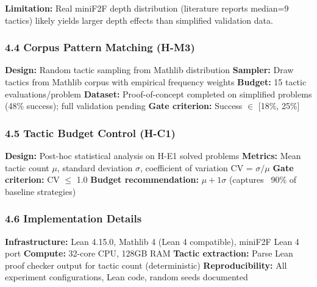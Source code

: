 \textbf{Limitation:} Real miniF2F depth distribution (literature reports median=9 tactics) likely yields larger depth effects than simplified validation data.

\subsubsection{4.4 Corpus Pattern Matching (H-M3)}

\textbf{Design:} Random tactic sampling from Mathlib distribution  
\textbf{Sampler:} Draw tactics from Mathlib corpus with empirical frequency weights  
\textbf{Budget:} 15 tactic evaluations/problem  
\textbf{Dataset:} Proof-of-concept completed on simplified problems (48\% success); full validation pending  
\textbf{Gate criterion:} Success $\in$ [18\%, 25\%]

\subsubsection{4.5 Tactic Budget Control (H-C1)}

\textbf{Design:} Post-hoc statistical analysis on H-E1 solved problems  
\textbf{Metrics:} Mean tactic count $\mu$, standard deviation $\sigma$, coefficient of variation CV = $\sigma /\mu$  
\textbf{Gate criterion:} CV $\leq$ 1.0  
\textbf{Budget recommendation:} $\mu + 1\sigma$ (captures ~90\% of baseline strategies)

\subsubsection{4.6 Implementation Details}

\textbf{Infrastructure:} Lean 4.15.0, Mathlib 4 (Lean 4 compatible), miniF2F Lean 4 port  
\textbf{Compute:} 32-core CPU, 128GB RAM  
\textbf{Tactic extraction:} Parse Lean proof checker output for tactic count (deterministic)  
\textbf{Reproducibility:} All experiment configurations, Lean code, random seeds documented
